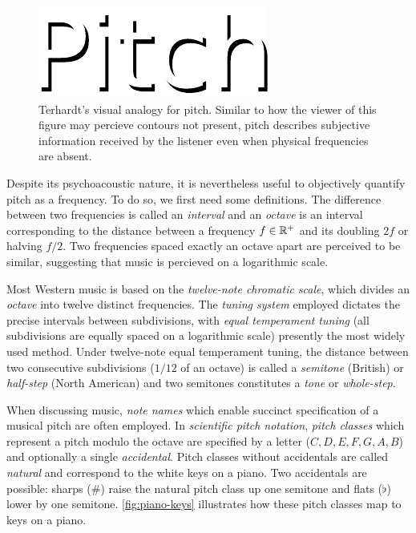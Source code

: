 \begin{figure}[htpb]
    \centering
    \includegraphics[width=0.6\linewidth]{Figures/pitch.pdf}
    \caption{Terhardt's visual analogy for pitch. Similar to how
        the viewer of this figure may percieve contours not present, pitch
        describes subjective information received by the listener even when
    physical frequencies are absent.}
    \label{fig:pitch}
\end{figure}

Despite its psychoacoustic nature, it is nevertheless useful to objectively
quantify pitch as a frequency. To do so, we first need some definitions. The
difference between two frequencies is called an \emph{interval} and an
\emph{octave} is an interval corresponding to the distance between a frequency
$f \in \mathbb{R}^+$ and its doubling $2f$ or halving $f/2$. Two frequencies spaced
exactly an octave apart are perceived to be similar, suggesting that music is
percieved on a logarithmic scale.

Most Western music is based on the \emph{twelve-note chromatic scale}, which
divides an \emph{octave} into twelve distinct frequencies. The \emph{tuning
system} employed dictates the precise intervals between subdivisions, with
\emph{equal temperament tuning} (all subdivisions are equally spaced on a
logarithmic scale) presently the most widely used
method\cite{denton1997history}. 
Under twelve-note equal temperament tuning, the distance between two
consecutive subdivisions ($1/12$ of an octave) is called a \emph{semitone}
(British) or \emph{half-step} (North American) and two semitones constitutes
a \emph{tone} or \emph{whole-step}.

When discussing music, \emph{note names} which enable succinct specification of
a musical pitch are often employed. In \emph{scientific pitch notation},
\emph{pitch classes} which represent a pitch modulo the octave are specified by
a letter ($C, D, E, F, G, A, B$) and optionally a single \emph{accidental}. Pitch
classes without accidentals are called \emph{natural} and correspond to the white
keys on a piano. Two accidentals are possible: sharps ($\#$) raise the natural
pitch class up one semitone and flats ($\flat$) lower by one semitone.
\autoref{fig:piano-keys} illustrates how these pitch classes map to keys on a
piano.

